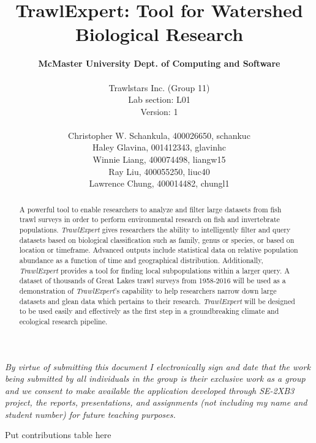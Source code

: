 \documentclass{article}
\begin{document}
\vfil
\title{\textbf{TrawlExpert: Tool for Watershed Biological Research}}
\author{\textbf{McMaster University Dept. of Computing and Software} \\ \\ Trawlstars Inc. (Group 11) \\ Lab section: L01  \\ Version: 1 \\ \\ Christopher W. Schankula, 400026650, schankuc \\ Haley Glavina, 001412343, glavinhc \\ Winnie Liang, 400074498, liangw15 \\ Ray Liu, 400055250, liuc40 \\ Lawrence Chung, 400014482, chungl1}
\vfil
\maketitle

\newpage
\begin{versionhistory}
\end{versionhistory}

\noindent\textit{By virtue of submitting this document I electronically sign and date that the work being submitted by all individuals in the group is their exclusive work as a group and we consent to make available the application developed through SE-2XB3 project, the reports, presentations, and assignments (not including my name and student number) for future teaching purposes.} 

\newpage


Put contributions table here


\newpage



\newpage 

\begin{abstract}
\noindent A powerful tool to enable researchers to analyze and filter large datasets from fish trawl surveys in order to perform environmental research on fish and invertebrate populations. \textit{TrawlExpert} gives researchers the ability to intelligently filter and query datasets based on biological classification such as family, genus or species, or based on location or timeframe. Advanced outputs include statistical data on relative population abundance as a function of time and geographical distribution. Additionally, \textit{TrawlExpert} provides a tool for finding local subpopulations within a larger query. A dataset of thousands of Great Lakes trawl surveys from 1958-2016 will be used as a demonstration of \textit{TrawlExpert}'s capability to help researchers narrow down large datasets and glean data which pertains to their research. \textit{TrawlExpert} will be designed to be used easily and effectively as the first step in a groundbreaking climate and ecological research pipeline.
\end{abstract}
\end{document}
